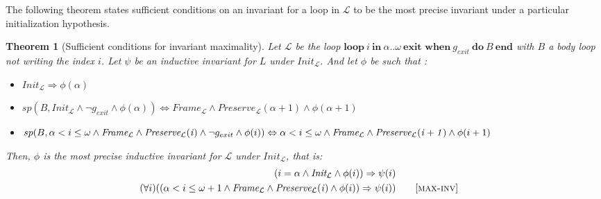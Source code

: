 \documentclass[a4paper,10pt]{article}
\newcommand{\prog}{\ensuremath{\mathcal{L}}\xspace}
\newcommand{\idx}{\ensuremath{i}\xspace}
\newcommand{\idxinitial}{\ensuremath{\alpha}\xspace}
\newcommand{\idxfinal}{\ensuremath{\omega}\xspace}
\newcommand{\KWloop}{\ensuremath{\mathrm{\textbf{loop}}~}}
\newcommand{\KWdo}{\ensuremath{\mathrm{\textbf{do}}~}}
\newcommand{\KWend}{\ensuremath{\mathrm{\textbf{end}}}}
\newcommand{\KWin}{\ensuremath{~\mathrm{\textbf{in}}~}}
\newcommand{\KWexit}{\ensuremath{\mathrm{\textbf{exit when}}~}}
\newcommand{\initcond}[1]{\ensuremath{\mathit{Init_{#1}}}}
\newcommand{\framecond}[1]{\ensuremath{\mathit{Frame_{#1}}}}
\newcommand{\preservecond}[2]{\ensuremath{\mathit{Preserve_{#1}(#2)}}}
\newcommand{\maxinv}{\textsc{max-inv}\xspace}
\newtheorem{theorem}{Theorem}[section]
\newcommand{\spostsym}{\ensuremath{sp}\xspace}
\newcommand{\spost}[2]{\ensuremath{\spostsym(#1,#2)}}
\begin{document}
The following theorem states sufficient conditions on an invariant for
a loop in \prog to be the most precise invariant under a particular
initialization hypothesis. 

\begin{theorem}[Sufficient conditions for invariant maximality]
\label{lem:precise-inv} 
Let \prog be the loop \textnormal{$\KWloop  \idx \KWin \idxinitial ..\idxfinal ~
\KWexit g_{exit}~ \KWdo B ~\KWend$} with $B$ a body loop not writing the index \idx.
Let $\psi$ be an inductive invariant for $L$ under \initcond{\prog}.
And let $\phi$ be such that : 
\begin{itemize}
\item[(a)] $\initcond{\prog} \Rightarrow \phi(\idxinitial)$ 
\item[(b)] $\spost{B}{\initcond{\prog} \land \neg g_{exit} \land \phi(\idxinitial)} 
             \Leftrightarrow  
            \framecond{\prog} \land \preservecond{\prog}{\idxinitial+1} \land  \phi(\idxinitial+1)$
\item[(c)] $\spost{B}{\idxinitial < \idx \leq \idxfinal \land  \framecond{\prog} \land \preservecond{\prog}{\idx} \land \neg g_{exit} \land \phi(\idx)} 
             \Leftrightarrow \\
            \idxinitial < \idx \leq \idxfinal \land \framecond{\prog} \land \preservecond{\prog}{\idx+1} \land \phi(\idx+1)$
\end{itemize}
\noindent Then, $\phi$ is the most precise inductive invariant for \prog under \initcond{\prog},
that is:
\begin{align*}
(\idx = \idxinitial \land \initcond{\prog} \land \phi(\idx)) \Rightarrow  \psi(\idx)\\
(\forall \idx) ((\idxinitial < \idx \leq \idxfinal+1 \land \framecond{\prog} \land \preservecond{\prog}{\idx} \land \phi(i))
\Rightarrow \psi(i))  & \quad \quad [\maxinv]
\end{align*}
\end{theorem}
\end{document}
